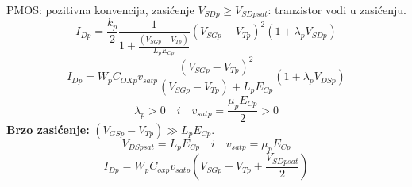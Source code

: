 \begin{frame}[label=09_2-s015]{PMOS: pozitivna konvencija, zasićenje}
\setlength{\abovedisplayskip}{3pt}\setlength{\belowdisplayskip}{3pt}
$V_{SDp}\geq V_{SDpsat}$: tranzistor vodi u zasićenju.\[I_{Dp}=\frac{k_p}2\frac1{1+\frac{(V_{SGp}-V_{Tp})}{L_pE_{Cp}}}(V_{SGp}-V_{Tp})^2(1+\lambda_pV_{SDp})\]
\[I_{Dp}=W_pC_{OXp}v_{satp}\frac{(V_{SGp}-V_{Tp})^2}{(V_{SGp}-V_{Tp})+L_pE_{Cp}}(1+\lambda_pV_{DSp})\]
\[\lambda_p>0\quad\textit{i}\quad v_{satp}=\frac{\mu_pE_{Cp}}2>0\]
\textbf{Brzo zasićenje:} $(V_{GSp}-V_{Tp})\gg L_pE_{Cp}$.\[V_{DSpsat}=L_pE_{Cp}\quad\textit{i}\quad v_{satp}=\mu_pE_{Cp}\]
\[I_{Dp}=W_pC_{oxp}v_{satp}\left(V_{SGp}+V_{Tp}+\frac{V_{SDpsat}}2\right)\]

\end{frame}
